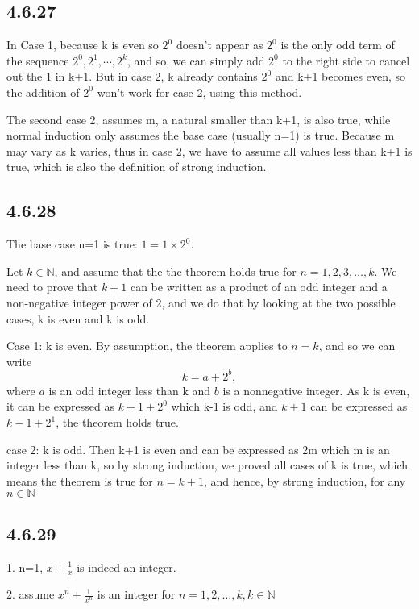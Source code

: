 \documentclass{article}
\begin{document}
\subsection*{4.6.27}

In Case 1, because k is even so $2^0$ doesn't appear as $2^0$ is the only odd term of the sequence $2^0, 2^1, \cdots, 2^k$, and so, we can simply add $2^0$ to the right side to cancel out the 1 in k+1. But in case 2, k already contains $2^0$ and k+1 becomes even, so the addition of $2^0$ won't work for case 2, using this method.

The second case 2, assumes m, a natural smaller than k+1, is also true, while normal induction only assumes the base case (usually n=1) is true. Because m may vary as k varies, thus in case 2, we have to assume all values less than k+1 is true, which is also the definition of strong induction.

\subsection*{4.6.28}

The base case n=1 is true: $1=1\times 2^0$.

Let $k\in\mathbb{N}$, and assume that the the theorem holds true for $n=1,2,3,\ldots,k$. We need to prove that $k+1$ can be written as a product of an odd integer and a non-negative integer power of 2, and we do that by looking at the two possible cases, k is even and k is odd.

Case 1: k is even. By assumption, the theorem applies to $n=k$, and so we can write $$k=a+2^b,$$ where $a$ is an odd integer less than k and $b$ is a nonnegative integer. As k is even, it can be expressed as $k-1 + 2^0$ which k-1 is odd, and $k+1$ can be expressed as $k-1 + 2^1$, the theorem holds true. 

case 2: k is odd. Then k+1 is even and can be expressed as 2m which m is an integer less than k, so by strong induction, we proved all cases of k is true, which means the theorem is true for $n=k+1$, and hence, by strong induction, for any $n\in\mathbb{N}$

\subsection*{4.6.29}

1. n=1, $x+\frac{1}{x}$ is indeed an integer.

2. assume $x^n+\frac{1}{x^n}$ is an integer for $n=1,2,\ldots,k, k\in\mathbb{N}$
\end{document}
